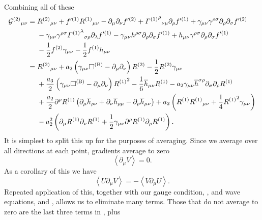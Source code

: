 Combining all of these
\begin{align}
{\mathcal{G}^{(2)}}_{\mu\nu} = {} & {R^{(2)}}_{\mu\nu} + f'^{(1)}{R^{(1)}}_{\mu\nu} - \partial_\mu\partial_\nu f'^{(2)} + {{\Gamma^{(1)}}^\rho}_{\nu\mu}\partial_\rho f'^{(1)} + \gamma_{\mu\nu}\gamma^{\rho\sigma}\partial_\rho\partial_\sigma f'^{(2)} \nonumber \\*
  & - {} \gamma_{\mu\nu}\gamma^{\rho\sigma}{{\Gamma^{(1)}}^\lambda}_{\sigma\rho}\partial_\lambda f'^{(1)} - \gamma_{\mu\nu}h^{\rho\sigma}\partial_\rho\partial_\sigma f'^{(1)} + h_{\mu\nu}\gamma^{\rho\sigma}\partial_\rho\partial_\sigma f'^{(1)} \nonumber \\*
  & - {} \frac{1}{2}f^{(2)}\gamma_{\mu\nu} - \frac{1}{2}f^{(1)}h_{\mu\nu} \nonumber \\*
 = {} & {R^{(2)}}_{\mu\nu} + a_2\left(\gamma_{\mu\nu}\Box^{(\text{B})} - \partial_\mu\partial_\nu\right)R^{(2)} - \frac{1}{2}R^{(2)}\gamma_{\mu\nu} \nonumber \\*
  & + {} \frac{a_3}{2}\left(\gamma_{\mu\nu}\Box^{(\text{B})} - \partial_\mu\partial_\nu\right){R^{(1)}}^2 - \frac{1}{6}\overline{h}_{\mu\nu}R^{(1)} - a_2\gamma_{\mu\nu}\overline{h}^{\sigma\rho}\partial_\sigma\partial_\rho R^{(1)} \nonumber \\*
  & + {} \frac{a_2}{2} \partial^\rho R^{(1)} \left(\partial_\mu\overline{h}_{\rho\nu} + \partial_\nu\overline{h}_{\rho\mu} - \partial_\rho\overline{h}_{\mu\nu}\right) + a_2\left(R^{(1)}{R^{(1)}}_{\mu\nu} + \frac{1}{4}{R^{(1)}}^2\gamma_{\mu\nu}\right) \nonumber \\* 
  & - {} a_2^2\left(\partial_\mu R^{(1)}\partial_\nu R^{(1)} + \frac{1}{2} \gamma_{\mu\nu}\partial^\rho R^{(1)}\partial_\rho R^{(1)}\right).
 \label{eq:G2}
\end{align}
It is simplest to split this up for the purposes of averaging. Since we average over all directions at each point, gradients average to zero~\cite{Hobson2006, Stein2011}
\begin{equation}
\left\langle\partial_\mu V\right\rangle = 0.
\end{equation}
As a corollary of this we have
\begin{equation}
\left\langle U\partial_\mu V\right\rangle = -\left\langle V \partial_\mu U\right\rangle.
\end{equation}
Repeated application of this, together with our gauge condition, , and wave equations,  and , allows us to eliminate many terms. Those that do not average to zero are the last three terms in , plus
